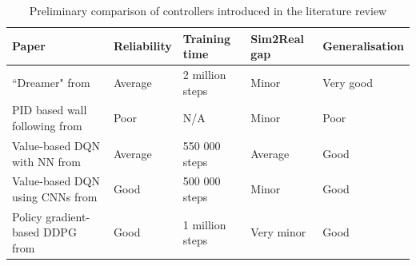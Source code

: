 \begin{table}[H]
\centering
\begin{tabularx}{\textwidth}{||X|l|l|l|l||} 
 \hline
 Paper & Reliability & Training time & Sim2Real gap & Generalisation\\ [0.5ex] 
 \hline\hline
 ``Dreamer" from \cite{modelbased} & Average & 2 million steps & Minor &  Very good\\
 \hline
 PID based wall following from \cite{wallfollowcourse} & Poor & N/A & Minor & Poor \\
 \hline
  Value-based DQN with NN from \cite{bosello} & Average & 550 000 steps & Average & Good \\
 \hline
 Value-based DQN using CNNs from \cite{bosello} & Good & 500 000 steps & Minor & Good \\
 \hline
 Policy gradient-based DDPG from \cite{Reference4} & Good & 1 million steps & Very minor & Good\\ [1ex] 
 \hline
\end{tabularx}
\caption{Preliminary comparison of controllers introduced in the literature review}
\label{prelieval}
\end{table}



